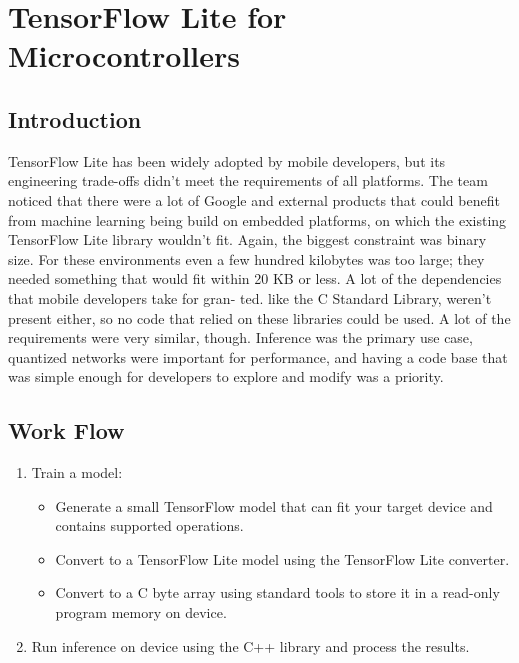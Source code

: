 \section{TensorFlow Lite for Microcontrollers}

\subsection{Introduction}

TensorFlow Lite has been widely adopted by mobile developers, but its engineering trade-offs didn't meet the requirements of all platforms. The team noticed that there were a lot of Google and external products that could benefit from machine learning being build on embedded platforms, on which the existing TensorFlow Lite library wouldn't fit. Again, the biggest constraint was binary size. For these environments even a few hundred kilobytes was too large; they needed something that would fit within 20 KB or less. A lot of the dependencies that mobile developers take for gran- ted. like the C Standard Library, weren't present either, so no code that relied on these libraries could be used. A lot of the requirements were very similar, though. Inference was the primary use case, quantized networks were important for performance, and having a code base that was simple enough for developers to explore and modify was a priority.\cite{TensorFlow:2023}

\subsection{Work Flow}

\begin{enumerate}
	
	\item Train a model:
	
	\begin{itemize}
		
		\item Generate a small TensorFlow model that can fit your target device and contains supported operations.
		
		\item Convert to a TensorFlow Lite model using the TensorFlow Lite converter.
		
		\item Convert to a C byte array using standard tools to store it in a read-only program memory on device.
		
	\end{itemize}
	
	\item Run inference on device using the C++ library and process the results.
	
\end{enumerate}

